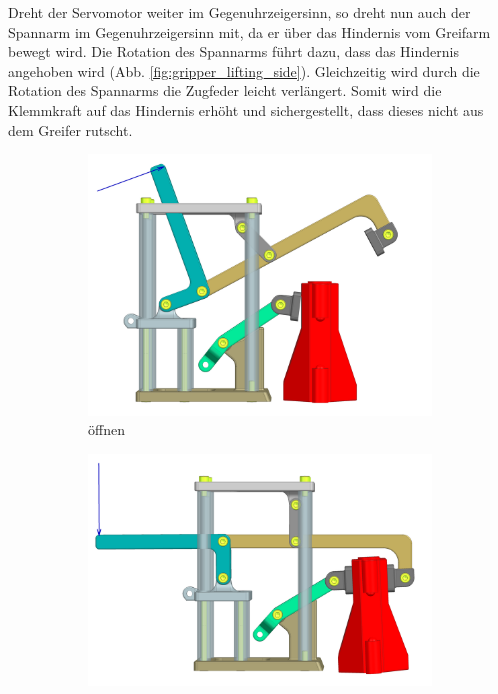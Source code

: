 Dreht der Servomotor weiter im Gegenuhrzeigersinn, so dreht nun auch der Spannarm im Gegenuhrzeigersinn mit, da er über das Hindernis vom Greifarm bewegt wird. Die Rotation des Spannarms führt dazu, dass das Hindernis angehoben wird (Abb. \ref{fig:gripper_lifting_side}). Gleichzeitig wird durch die Rotation des Spannarms die Zugfeder leicht verlängert. Somit wird die Klemmkraft auf das Hindernis erhöht und sichergestellt, dass dieses nicht aus dem Greifer rutscht.

\begin{figure}[H]
\centering
\begin{subfigure}{0.49\textwidth}
\centering
\includegraphics[width=\textwidth]{assets/greifer-prototyp/Greifer_side_Offen.png}
\caption{öffnen}
\label{fig:gripper_opening_side}
\end{subfigure}
\begin{subfigure}{0.49\textwidth}
\centering
\includegraphics[width=\textwidth]{assets/greifer-prototyp/Greifer_side_Klemmen.png}

\end{subfigure}
\end{figure}
